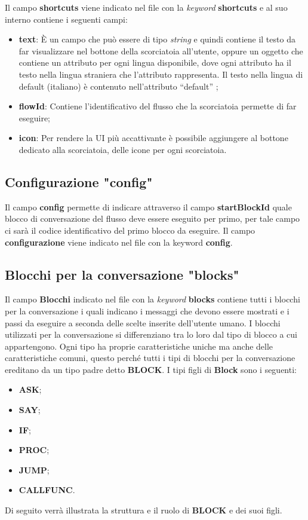 Il campo \textbf{shortcuts} viene indicato nel file con la \emph{keyword} \textbf{shortcuts}
e al suo interno contiene i seguenti campi:
\begin{itemize}
	\item \textbf{text}: È un campo che può essere di tipo \emph{string} e quindi contiene il testo da far visualizzare nel bottone della scorciatoia all'utente, oppure un oggetto che contiene un attributo per ogni lingua disponibile, dove ogni attributo ha il testo nella lingua straniera che l'attributo rappresenta. Il testo nella lingua di default (italiano) è contenuto nell’attributo “default” ;
	\item \textbf{flowId}: Contiene l'identificativo del flusso che la scorciatoia permette di far eseguire;
	\item \textbf{icon}: Per rendere la UI più accattivante è possibile aggiungere al bottone dedicato alla scorciatoia, delle icone per ogni scorciatoia.
\end{itemize}
\clearpage
\subsection{Configurazione "config"}
Il campo \textbf{config} permette di indicare attraverso il campo \textbf{startBlockId} quale blocco di conversazione del flusso deve essere eseguito per primo, per tale campo ci sarà il codice identificativo del primo blocco da eseguire. Il campo \textbf{configurazione} viene indicato nel file con la keyword \textbf{config}.

\subsection{Blocchi per la conversazione "blocks"}
Il campo \textbf{Blocchi} indicato nel file con la \emph{keyword} \textbf{blocks} contiene tutti i blocchi per la conversazione i quali indicano i messaggi che devono essere mostrati e i passi da eseguire a seconda delle scelte inserite dell'utente umano.
I blocchi utilizzati per la conversazione si differenziano tra lo loro dal tipo di blocco a cui appartengono. Ogni tipo ha proprie caratteristiche uniche ma anche delle caratteristiche comuni, questo perché tutti i tipi di blocchi per la conversazione ereditano da un tipo padre detto \textbf{BLOCK}. I tipi figli di \textbf{Block} sono i seguenti:
\begin{itemize}
	\item\textbf{ASK};
	\item\textbf{SAY};
	\item\textbf{IF};
	\item\textbf{PROC};
	\item\textbf{JUMP};
	\item\textbf{CALLFUNC}.
\end{itemize}
Di seguito verrà illustrata la struttura e il ruolo di \textbf{BLOCK} e dei suoi figli.
